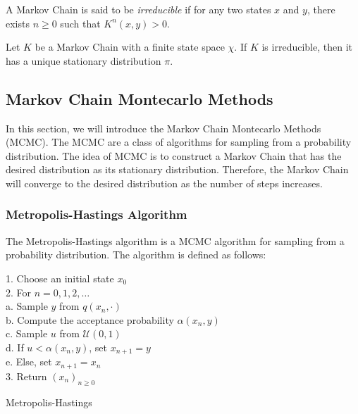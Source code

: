 \documentclass{article}
\begin{document}
\begin{definition}
	A Markov Chain is said to be \textit{irreducible} if for any two states $x$ and $y$, there exists $n \geq 0$ such that $K^n(x,y) > 0$.
\end{definition}

\begin{proposition}
	Let $K$ be a Markov Chain with a finite state space $\chi$. If $K$ is irreducible, then it has a unique stationary distribution $\pi$.
\end{proposition}

\subsection{Markov Chain Montecarlo Methods}

In this section, we will introduce the Markov Chain Montecarlo Methods (MCMC). The MCMC are a class of algorithms for sampling from a probability distribution. The idea of MCMC is to construct a Markov Chain that has the desired distribution as its stationary distribution. Therefore, the Markov Chain will converge to the desired distribution as the number of steps increases.

\subsubsection{Metropolis-Hastings Algorithm}

The Metropolis-Hastings algorithm is a MCMC algorithm for sampling from a probability distribution. The algorithm is defined as follows:

\begin{center}
	\begin{minipage}{0.7\linewidth} %
		\begin{algorithm}[H]
			1. Choose an initial state $x_0$ \\
			2. For $n = 0, 1, 2, \dots$ \\
			\hspace*{0.5cm} a. Sample $y$ from $q(x_n, \cdot)$ \\
			\hspace*{0.5cm} b. Compute the acceptance probability $\alpha(x_n, y)$ \\
			\hspace*{0.5cm} c. Sample $u$ from $\mathcal{U}(0,1)$ \\
			\hspace*{0.5cm} d. If $u < \alpha(x_n, y)$, set $x_{n+1} = y$ \\
			\hspace*{0.5cm} e. Else, set $x_{n+1} = x_n$ \\
			3. Return $(x_n)_{n \geq 0}$
			\caption{Metropolis-Hastings} %
			\label{alg:Metropolis-Hastings}   %
		\end{algorithm}
	\end{minipage}
\end{center}
\end{document}
